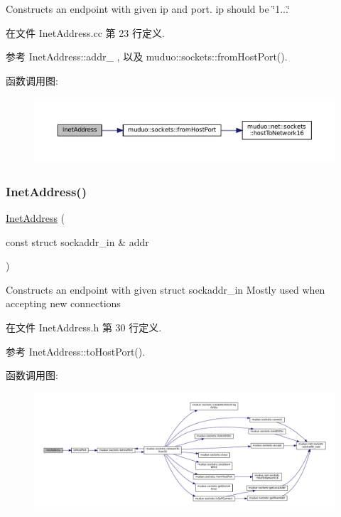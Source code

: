 Constructs an endpoint with given ip and port. {\ttfamily ip} should be \char`\"{}1...\char`\"{} 

在文件 Inet\+Address.\+cc 第 23 行定义.



参考 Inet\+Address\+::addr\+\_\+ , 以及 muduo\+::sockets\+::from\+Host\+Port().

函数调用图\+:
\nopagebreak
\begin{figure}[H]
\begin{center}
\leavevmode
\includegraphics[width=350pt]{classmuduo_1_1InetAddress_ad4031243c174a53e1d2ff57e97f8226b_cgraph}
\end{center}
\end{figure}
\mbox{\label{classmuduo_1_1InetAddress_a8d41e312d44ecfdf968e66a26fea15ab}} 
\subsubsection{\texorpdfstring{Inet\+Address()}{InetAddress()}\hspace{0.1cm}{\footnotesize\ttfamily [3/3]}}
{\footnotesize\ttfamily \hyperlink{classmuduo_1_1InetAddress}{Inet\+Address} (\begin{DoxyParamCaption}\item[{const struct sockaddr\+\_\+in \&}]{addr }\end{DoxyParamCaption})\hspace{0.3cm}{\ttfamily [inline]}}

Constructs an endpoint with given struct {\ttfamily sockaddr\+\_\+in} Mostly used when accepting new connections 

在文件 Inet\+Address.\+h 第 30 行定义.



参考 Inet\+Address\+::to\+Host\+Port().

函数调用图\+:
\nopagebreak
\begin{figure}[H]
\begin{center}
\leavevmode
\includegraphics[width=350pt]{classmuduo_1_1InetAddress_a8d41e312d44ecfdf968e66a26fea15ab_cgraph}
\end{center}
\end{figure}


